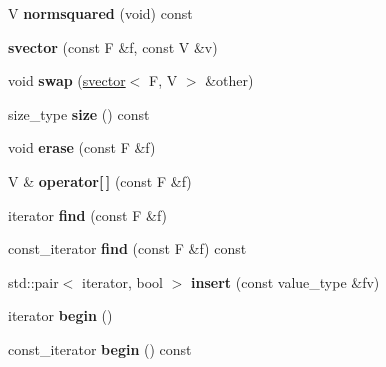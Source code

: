 \begin{DoxyCompactItemize}
\item 
\hypertarget{classsvector_ab2252c92adf6656d0bde5aec708a371f}{
V {\bfseries normsquared} (void) const }
\label{classsvector_ab2252c92adf6656d0bde5aec708a371f}

\item 
\hypertarget{classsvector_af80c78063c502c408ce9de9e29802c4e}{
{\bfseries svector} (const F \&f, const V \&v)}
\label{classsvector_af80c78063c502c408ce9de9e29802c4e}

\item 
\hypertarget{classsvector_a7f6261a28ccf2e7e38b8921716a35e3b}{
void {\bfseries swap} (\hyperlink{classsvector}{svector}$<$ F, V $>$ \&other)}
\label{classsvector_a7f6261a28ccf2e7e38b8921716a35e3b}

\item 
\hypertarget{classsvector_ad6df678466732e7a17ea1b1223ff7747}{
size\_\-type {\bfseries size} () const }
\label{classsvector_ad6df678466732e7a17ea1b1223ff7747}

\item 
\hypertarget{classsvector_aa7a575ad6a3a810adf89785b4a5d49b3}{
void {\bfseries erase} (const F \&f)}
\label{classsvector_aa7a575ad6a3a810adf89785b4a5d49b3}

\item 
\hypertarget{classsvector_ae1a20b7ecc6899bc36f6c74c09b80f21}{
V \& {\bfseries operator\mbox{[}$\,$\mbox{]}} (const F \&f)}
\label{classsvector_ae1a20b7ecc6899bc36f6c74c09b80f21}

\item 
\hypertarget{classsvector_a8654fa07ce4f88f6f1f781ddd4968da9}{
iterator {\bfseries find} (const F \&f)}
\label{classsvector_a8654fa07ce4f88f6f1f781ddd4968da9}

\item 
\hypertarget{classsvector_ab57caec3eab9d57eaec2ad1c436fc3d6}{
const\_\-iterator {\bfseries find} (const F \&f) const }
\label{classsvector_ab57caec3eab9d57eaec2ad1c436fc3d6}

\item 
\hypertarget{classsvector_a8a296d1d27c0242a6d8c89d4fdf67388}{
std::pair$<$ iterator, bool $>$ {\bfseries insert} (const value\_\-type \&fv)}
\label{classsvector_a8a296d1d27c0242a6d8c89d4fdf67388}

\item 
\hypertarget{classsvector_ad62a2162f09c4d4ea2b9ab9a93ebdfdd}{
iterator {\bfseries begin} ()}
\label{classsvector_ad62a2162f09c4d4ea2b9ab9a93ebdfdd}

\item 
\hypertarget{classsvector_a24c1e2612bd13a2bf259dc2627675dfa}{
const\_\-iterator {\bfseries begin} () const }
\label{classsvector_a24c1e2612bd13a2bf259dc2627675dfa}


\end{DoxyCompactItemize}
